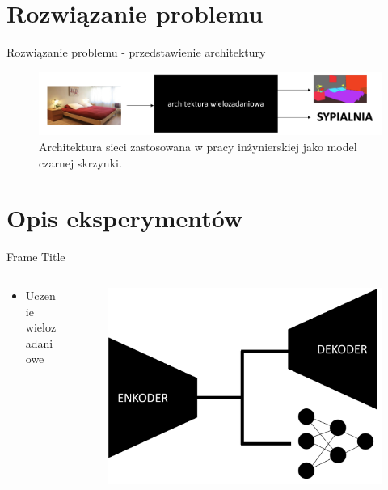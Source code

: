 \documentclass[10pt]{beamer}
\begin{document}
\section*{Rozwiązanie problemu}
\begin{frame}{Rozwiązanie problemu - przedstawienie architektury}
    \begin{figure}
        \includegraphics[width=\textwidth]{images/blackbox-2.png}
        \caption{Architektura sieci zastosowana w pracy inżynierskiej jako model czarnej skrzynki.}
    \end{figure}
\end{frame}


\section*{Opis eksperymentów}
\begin{frame}{Frame Title}
    \begin{columns}
        \begin{column}{0.5\textwidth}
            \begin{itemize}
               \item Uczenie wielozadaniowe
            \end{itemize}
        \end{column}

        \begin{column}{0.5\textwidth}
            \begin{figure}
                \includegraphics[width=\textwidth]{images/archs/multitask.png}
            \end{figure}
        \end{column}
    \end{columns}
\end{frame}
\end{document}
